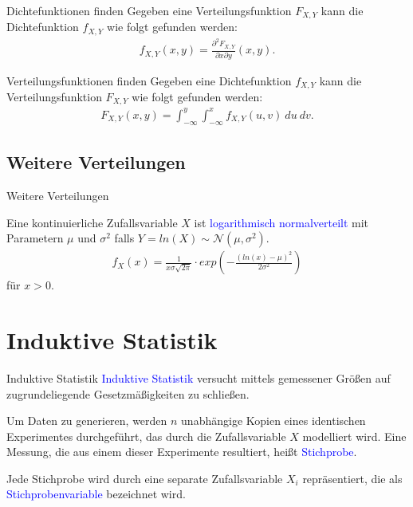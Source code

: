 \documentclass{beamer}
\def\padding{\vspace{0.5cm}}
\def\b{\textcolor{blue}}
\begin{document}
\begin{frame}
    \begin{block}{Dichtefunktionen finden}
        Gegeben eine Verteilungsfunktion $F_{X,Y}$ kann die Dichtefunktion $f_{X,Y}$ wie folgt gefunden werden:
        \begin{align*}
            f_{X,Y}(x,y) = \frac{\partial^2 F_{X,Y}}{\partial x \partial y}(x,y).
        \end{align*}
    \end{block}\pause\par\padding
    \begin{block}{Verteilungsfunktionen finden}
        Gegeben eine Dichtefunktion $f_{X,Y}$ kann die Verteilungsfunktion $F_{X,Y}$ wie folgt gefunden werden:
        \begin{align*}
            F_{X,Y}(x,y) = \int_{- \infty}^y \int_{- \infty}^x f_{X,Y}(u,v)\ du\ dv.
        \end{align*}
    \end{block}
\end{frame}

\subsection{Weitere Verteilungen}
\begin{frame}{Weitere Verteilungen}
    \begin{definition}
        Eine kontinuierliche Zufallsvariable $X$ ist \b{logarithmisch normalverteilt} mit Parametern $\mu$ und $\sigma^2$ falls $Y = ln(X) \sim \mathcal{N}(\mu, \sigma^2)$.\pause
        \begin{align*}
            f_X(x) = \frac{1}{x \sigma \sqrt{2 \pi}} \cdot exp\left(-\frac{(ln(x) - \mu)^2}{2 \sigma^2}\right)
        \end{align*} für $x > 0$.
    \end{definition}
\end{frame}

\section{Induktive Statistik}
\begin{frame}{Induktive Statistik}
    \b{Induktive Statistik} versucht mittels gemessener Größen auf zugrundeliegende Gesetzmäßigkeiten zu schließen.\pause\par
    Um Daten zu generieren, werden $n$ unabhängige Kopien eines identischen Experimentes durchgeführt, das durch die Zufallsvariable $X$ modelliert wird. Eine Messung, die aus einem dieser Experimente resultiert, heißt \b{Stichprobe}.\pause\par
    Jede Stichprobe wird durch eine separate Zufallsvariable $X_i$ repräsentiert, die als \b{Stichprobenvariable} bezeichnet wird.
\end{frame}
\end{document}
